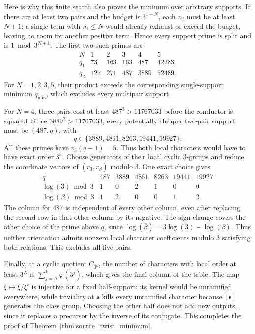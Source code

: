 Here is why this finite search also proves the minimum over arbitrary
supports.  If there are at least two pairs and the budget is
$3^{1-N}$, each $n_i$ must be at least $N+1$: a single term with
$n_i\le N$ would already exhaust or exceed the budget, leaving no
room for another positive term.  Hence every support prime is split
and is $1\bmod3^{N+1}$.  The first two such primes are
\[
\begin{array}{c|rrrrr}
N&1&2&3&4&5\\ \hline
q_1&73&163&163&487&42283\\
q_2&127&271&487&3889&52489.
\end{array}
\]
For $N=1,2,3,5$, their product exceeds the corresponding
single-support minimum $q_{\min}$, which excludes every multipair
support.

For $N=4$, three pairs cost at least $487^3>11767033$ before the
conductor is squared.  Since $3889^2>11767033$, every potentially
cheaper two-pair support must be $(487,q)$, with
\[
                q\in\{3889,4861,8263,19441,19927\}.
\]
All these primes have $v_3(q-1)=5$.  Thus both local characters
would have to have exact order $3^5$.  Choose generators of their
local cyclic $3$-groups and reduce the coordinate vectors of
$(r_3,r_\beta)$ modulo $3$.  One exact choice gives
\[
\begin{array}{c|rrrrrr}
q&487&3889&4861&8263&19441&19927\\ \hline
\log(3)\bmod3&1&0&2&1&0&0\\
\log(\beta)\bmod3&1&2&0&0&1&2.
\end{array}
\]
The column for $487$ is independent of every other column, even
after replacing the second row in that other column by its negative.
The sign change covers the other choice of the prime above $q$,
since $\log(\bar\beta)=3\log(3)-\log(\beta)$.
Thus neither orientation admits nonzero local character coefficients
modulo $3$ satisfying both relations.  This excludes all five pairs.

Finally, at a cyclic quotient $C_{3^k}$, the number of characters
with local order at least $3^N$ is
$\sum_{j=N}^{k}\varphi(3^j)$, which gives the final column of the
table.  The map $\xi\mapsto\xi/\xi^c$ is injective for a fixed
half-support: its kernel would be unramified everywhere, while
triviality at $\mathfrak s$ kills every unramified character because
$[\mathfrak s]$ generates the class group.  Choosing the other half
does not add new outputs, since it replaces a precursor by the inverse
of its conjugate.  This completes the proof of
Theorem~\ref{thm:source_twist_minimum}.

